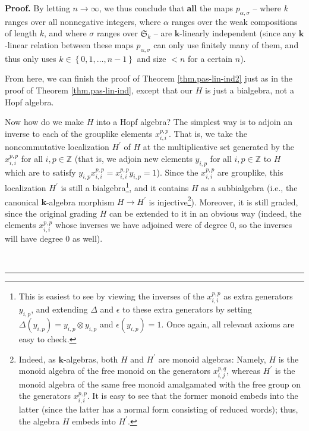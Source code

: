 \documentclass[numbers=enddot,12pt,final,onecolumn,notitlepage]{scrartcl}%
\theoremstyle{definition}
\newenvironment{proof}[1][Proof]{\noindent\textbf{#1.} }{\ \rule{0.5em}{0.5em}}
\begin{document}
\begin{proof}
By letting $n\rightarrow\infty$, we thus conclude that \textbf{all} the maps
$p_{\alpha,\sigma}$ -- where $k$ ranges over all nonnegative integers, where
$\alpha$ ranges over the weak compositions of length $k$, and where $\sigma$
ranges over $\mathfrak{S}_{k}$ -- are $\mathbf{k}$-linearly independent (since
any $\mathbf{k}$-linear relation between these maps $p_{\alpha,\sigma}$ can
only use finitely many of them, and thus only uses $k\in\left\{
0,1,\ldots,n-1\right\}  $ and size $<n$ for a certain $n$).

From here, we can finish the proof of Theorem \ref{thm.pas-lin-ind2} just as
in the proof of Theorem \ref{thm.pas-lin-ind}, except that our $H$ is just a
bialgebra, not a Hopf algebra.

Now how do we make $H$ into a Hopf algebra? The simplest way is to adjoin an
inverse to each of the grouplike elements $x_{i,i}^{p,p}$. That is, we take
the noncommutative localization $H^{\prime}$ of $H$ at the multiplicative set
generated by the $x_{i,i}^{p,p}$ for all $i,p\in\mathbb{Z}$ (that is, we
adjoin new elements $y_{i,p}$ for all $i,p\in\mathbb{Z}$ to $H$ which are to
satisfy $y_{i,p}x_{i,i}^{p,p}=x_{i,i}^{p,p}y_{i,p}=1$). Since the
$x_{i,i}^{p,p}$ are grouplike, this localization $H^{\prime}$ is still a
bialgebra\footnote{This is easiest to see by viewing the inverses of the
$x_{i,i}^{p,p}$ as extra generators $y_{i,p}$, and extending $\Delta$ and
$\epsilon$ to these extra generators by setting $\Delta\left(  y_{i,p}\right)
=y_{i,p}\otimes y_{i,p}$ and $\epsilon\left(  y_{i,p}\right)  =1$. Once again,
all relevant axioms are easy to check.}, and it contains $H$ as a subbialgebra
(i.e., the canonical $\mathbf{k}$-algebra morphism $H\rightarrow H^{\prime}$
is injective\footnote{Indeed, as $\mathbf{k}$-algebras, both $H$ and
$H^{\prime}$ are monoid algebras: Namely, $H$ is the monoid algebra of the
free monoid on the generators $x_{i,j}^{p,q}$, whereas $H^{\prime}$ is the
monoid algebra of the same free monoid amalgamated with the free group on the
generators $x_{i,i}^{p,p}$. It is easy to see that the former monoid embeds
into the latter (since the latter has a normal form consisting of reduced
words); thus, the algebra $H$ embeds into $H^{\prime}$.}). Moreover, it is
still graded, since the original grading $H$ can be extended to it in an
obvious way (indeed, the elements $x_{i,i}^{p,p}$ whose inverses we have
adjoined were of degree $0$, so the inverses will have degree $0$ as well).


\end{proof}
\end{document}
